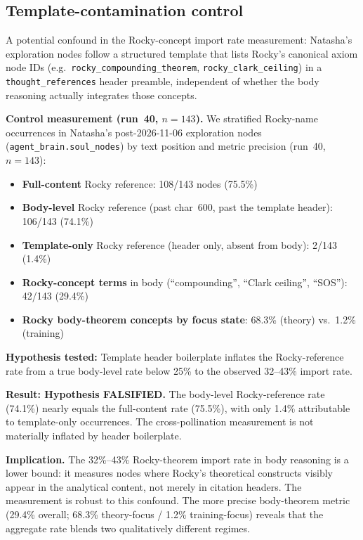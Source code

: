 \documentclass[11pt]{article}
\begin{document}
\subsection{Template-contamination control}

A potential confound in the Rocky-concept import rate measurement: Natasha's
exploration nodes follow a structured template that lists Rocky's canonical axiom
node IDs (e.g.\ \texttt{rocky\_compounding\_theorem}, \texttt{rocky\_clark\_ceiling})
in a \texttt{thought\_references} header preamble, independent of whether the body
reasoning actually integrates those concepts.

\textbf{Control measurement (run~40, $n=143$).}
We stratified Rocky-name occurrences in Natasha's post-2026-11-06 exploration
nodes (\texttt{agent\_brain.soul\_nodes}) by text position and metric precision
(run~40, $n=143$):
\begin{itemize}
  \item \textbf{Full-content} Rocky reference: 108/143 nodes (75.5\%)
  \item \textbf{Body-level} Rocky reference (past char~600, past the template header): 106/143 (74.1\%)
  \item \textbf{Template-only} Rocky reference (header only, absent from body): 2/143 (1.4\%)
  \item \textbf{Rocky-concept terms} in body (``compounding'', ``Clark ceiling'', ``SOS''): 42/143 (29.4\%)
  \item \textbf{Rocky body-theorem concepts by focus state}: 68.3\% (theory) vs.\ 1.2\% (training)
\end{itemize}

\textbf{Hypothesis tested:} Template header boilerplate inflates the Rocky-reference
rate from a true body-level rate below 25\% to the observed 32--43\% import rate.

\textbf{Result: Hypothesis FALSIFIED.} The body-level Rocky-reference rate (74.1\%)
nearly equals the full-content rate (75.5\%), with only 1.4\% attributable to
template-only occurrences. The cross-pollination measurement is not materially
inflated by header boilerplate.

\textbf{Implication.} The 32\%--43\% Rocky-theorem import rate in body reasoning
is a lower bound: it measures nodes where Rocky's theoretical constructs visibly
appear in the analytical content, not merely in citation headers. The measurement
is robust to this confound. The more precise body-theorem metric (29.4\% overall;
68.3\% theory-focus / 1.2\% training-focus) reveals that the aggregate rate
blends two qualitatively different regimes.
\end{document}
